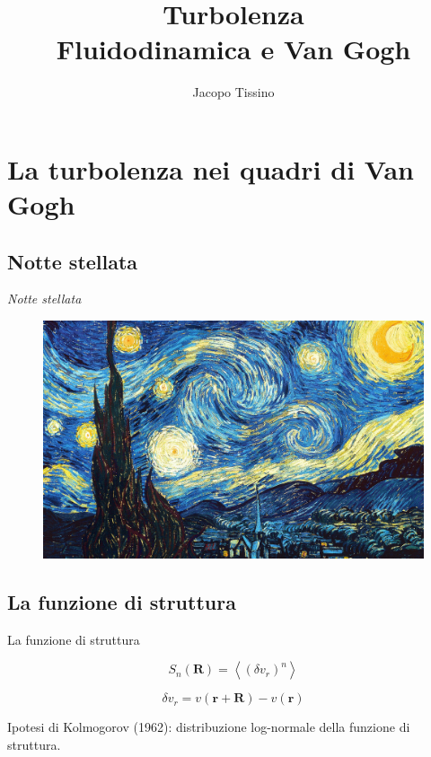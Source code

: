 \documentclass[11pt]{beamer}
\author{Jacopo Tissino}
\title{Turbolenza\\
Fluidodinamica e Van Gogh}
\institute{Liceo Scientifico ``M. Grigoletti''}
\begin{document}
\begin{frame}
\titlepage
\end{frame}

\begin{frame}
\tableofcontents
\end{frame}

\section{La turbolenza nei quadri di Van Gogh}

\subsection{Notte stellata}

\begin{frame}{\emph{Notte stellata}}
\begin{figure}
\centering
\includegraphics[scale=0.11]{the-starry-night-1889.jpg}
\end{figure}
\end{frame}

\subsection{La funzione di struttura}

\begin{frame}{La funzione di struttura}

\begin{equation}
S_n (\mathbf{R} ) =
\left\langle 
\left(
\delta v_r 
\right)^n
\right\rangle
\end{equation}

\begin{equation}
\delta v_r = v(\mathbf{r} + \mathbf{R}) - v(\mathbf{r})
\end{equation}

Ipotesi di Kolmogorov (1962): distribuzione log-normale della funzione di struttura.
\end{frame}
\end{document}
